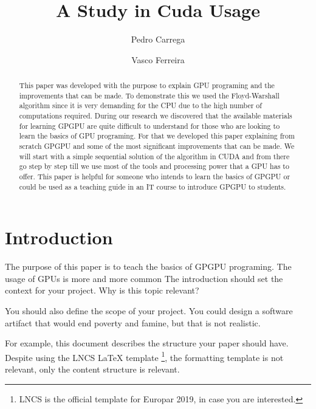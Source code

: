 \documentclass[runningheads]{llncs}
\begin{document}
\title{A Study in Cuda Usage}
\author{Pedro Carrega \and
Vasco Ferreira
}


\maketitle

\begin{abstract}
This paper was developed with the purpose to explain GPU programing and the improvements that can be made. To demonstrate this we used the Floyd-Warshall algorithm since it is very demanding for the CPU due to the high number of computations required. During our research we discovered that the available materials for learning GPGPU are quite difficult to understand for those who are looking to learn the basics of GPU programing. For that we developed this paper explaining from scratch GPGPU and some of the most significant improvements that can be made. We will start with a simple sequential solution of the algorithm in CUDA and from there go step by step till we use most of the tools and processing power that a GPU has to offer. This paper is helpful for someone who intends to learn the basics of GPGPU or could be used as a teaching guide in an IT course to introduce GPGPU to students.

\end{abstract}
%
%
%
\section{Introduction}

The purpose of this paper is to teach the basics of GPGPU programing. 
The usage of GPUs is more and more common 
The introduction should set the context for your project. Why is this topic relevant?

You should also define the scope of your project. You could design a software artifact that would end poverty and famine, but that is not realistic.

For example, this document describes the structure your paper should have. Despite using the LNCS LaTeX template \footnote{LNCS is the official template for Europar 2019, in case you are interested.}, the formatting template is not relevant, only the content structure is relevant.
\end{document}
